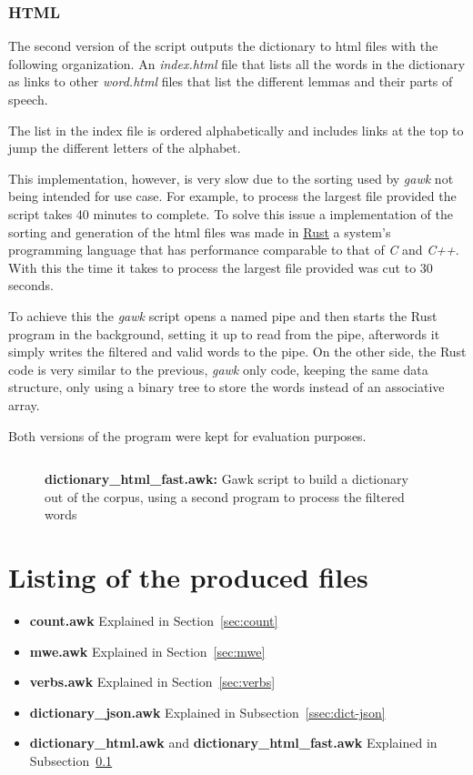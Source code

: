 \documentclass[a4paper]{report}
\begin{document}
\subsection{HTML}\label{ssec:dict-html}

The second version of the script outputs the dictionary to html files with the
following organization. An \textit{index.html} file that lists all the words in
the dictionary as links to other \textit{word.html} files that list the
different lemmas and their parts of speech.

The list in the index file is ordered alphabetically and includes links at the
top to jump the different letters of the alphabet.

This implementation, however, is very slow due to the sorting used by
\textit{gawk} not being intended for use case. For example, to process the
largest file provided the script takes 40 minutes to complete. To solve this
issue a implementation of the sorting and generation of the html files was made
in \href{https://www.rust-lang.org/}{Rust} a system's programming language that
has performance comparable to that of \textit{C} and \textit{C++}. With this
the time it takes to process the largest file provided was cut to 30 seconds.

To achieve this the \textit{gawk} script opens a named pipe and then starts the
Rust program in the background, setting it up to read from the pipe, afterwords
it simply writes the filtered and valid words to the pipe. On the other side,
the Rust code is very similar to the previous, \textit{gawk} only code, keeping
the same data structure, only using a binary tree to store the words instead of
an associative array.

Both versions of the program were kept for evaluation purposes.

\begin{figure}[H]
    \centering
    \inputminted[firstline=2]{awk}{../dictionary_html_fast.awk}
    \caption{\textbf{dictionary\_html\_fast.awk:} Gawk script to build a
    dictionary out of the corpus, using a second program to process the
    filtered words}\label{code:count}
\end{figure}

\chapter{Listing of the produced files}

\begin{itemize}
    \item \textbf{count.awk} Explained in Section~\ref{sec:count}
    \item \textbf{mwe.awk} Explained in Section~\ref{sec:mwe}
    \item \textbf{verbs.awk} Explained in Section~\ref{sec:verbs}
    \item \textbf{dictionary\_json.awk} Explained in
        Subsection~\ref{ssec:dict-json}
    \item \textbf{dictionary\_html.awk} and \textbf{dictionary\_html\_fast.awk}
        Explained in Subsection~\ref{ssec:dict-html}
\end{itemize}
\end{document}
